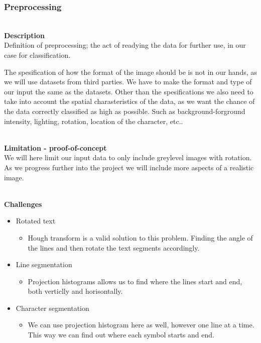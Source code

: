 \documentclass[11pt,a4paper,UKenglish]{article}
\begin{document}
\subsubsection{Preprocessing}
\noindent \\ \textbf{Description}
\noindent \\ Definition of preprocessing; the act of readying the data for
further use, in our case for classification. \par
The spesification of how the format of the image should be is not in our hands,
as we will use datasets from third parties. We have to make the format and
type of our input the same as the datasets. Other than the spesifications we
also need to take into account the spatial charasteristics of the data, as we
want the chance of the data correctly classified as high as possible. Such as
background-forground intensity, lighting, rotation, location of the
character, etc.. \par

\noindent \\ \textbf{Limitation - proof-of-concept}
\noindent \\ We will here limit our input data to only include greylevel
images with rotation. As we progress further into the project we will include
more aspects of a realistic image.

\noindent \\ \textbf{Challenges}
\begin{itemize}
 \item{Rotated text}
 \begin{itemize}
  \item{Hough transform is a valid solution to this problem. Finding the angle
  of the lines and then rotate the text segments accordingly.}
 \end{itemize}
 \item{Line segmentation}
 \begin{itemize}
  \item{Projection histograms allows us to find where the lines start and end,
  both verticlly and horisontally.}
 \end{itemize}
 \item{Character segmentation}
 \begin{itemize}
  \item{We can use projection histogram here as well, however one line at a
  time. This way we can find out where each symbol starts and end.}
 \end{itemize}
\end{itemize}
\end{document}
